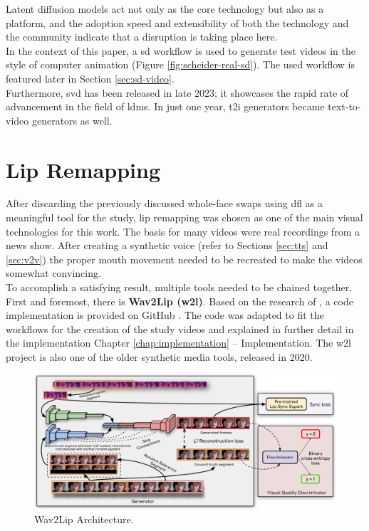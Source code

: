 \documentclass[
  a4paper,  %
  twoside,  %
  bibliography=totoc,
  headsepline,
  cleardoublepage=empty,
  parskip=half,
  draft=false
]{scrbook}
\begin{document}
Latent diffusion models act not only as the core technology but also as a platform, and the adoption speed and extensibility of both the technology and the community indicate that a disruption is taking place here. \\
In the context of this paper, a \gls{sd} workflow is used to generate test videos in the style of computer animation (Figure \ref{fig:scheider-real-sd}). The used workflow is featured later in Section \ref{sec:sd-video}. \\
Furthermore, \gls{svd} has been released in late 2023; it showcases the rapid rate of advancement in the field of \gls{ldm}s. In just one year, \gls{t2i} generators became text-to-video generators as well.


\section{Lip Remapping}
\label{sec:lips}
After discarding the previously discussed whole-face swaps using \gls{dfl} as a meaningful tool for the study, lip remapping was chosen as one of the main visual technologies for this work. The basis for many videos were real recordings from a news show. After creating a synthetic voice (refer to Sections \ref{sec:tts} and \ref{sec:v2v}) the proper mouth movement needed to be recreated to make the videos somewhat convincing. \\
To accomplish a satisfying result, multiple tools needed to be chained together. First and foremost, there is \textbf{Wav2Lip (\gls{w2l})}. Based on the research of \citet{prajwalLipSyncExpert2020}, a code implementation is provided on GitHub \cite{mukhopadhyayWav2LipAccuratelyLipsyncing2023}. The code was adapted to fit the workflows for the creation of the study videos and explained in further detail in the implementation Chapter \ref{chap:implementation} – Implementation. The \gls{w2l} project is also one of the older synthetic media tools, released in 2020.

\begin{figure}[h]
  \centering
  \includegraphics[width=1\textwidth]{./graphics/w2l-arch.png}
  \caption{Wav2Lip Architecture.}
  \label{fig:wav2lip-arch}
\end{figure}
\end{document}
